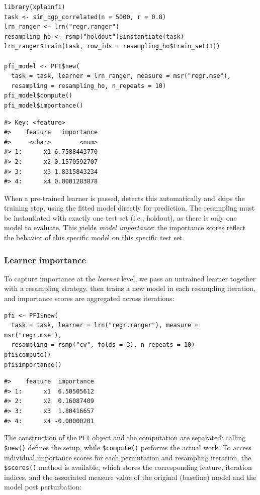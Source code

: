 \begin{verbatim}
library(xplainfi)
task <- sim_dgp_correlated(n = 5000, r = 0.8)
lrn_ranger <- lrn("regr.ranger")
resampling_ho <- rsmp("holdout")$instantiate(task)
lrn_ranger$train(task, row_ids = resampling_ho$train_set(1))

pfi_model <- PFI$new(
  task = task, learner = lrn_ranger, measure = msr("regr.mse"),
  resampling = resampling_ho, n_repeats = 10)
pfi_model$compute()
pfi_model$importance()
\end{verbatim}

\begin{verbatim}
#> Key: <feature>
#>    feature   importance
#>     <char>        <num>
#> 1:      x1 6.7588443770
#> 2:      x2 0.1570592707
#> 3:      x3 1.8315843234
#> 4:      x4 0.0001283878
\end{verbatim}

When a pre-trained learner is passed,  detects this automatically and skips the training step, using the fitted model directly for prediction.
The resampling must be instantiated with exactly one test set (i.e., holdout), as there is only one model to evaluate.
This yields \emph{model importance}: the importance scores reflect the behavior of this specific model on this specific test set.

\subsubsection{Learner importance}\label{learner-importance}

To capture importance at the \emph{learner} level, we pass an untrained learner together with a resampling strategy.
 then trains a new model in each resampling iteration, and importance scores are aggregated across iterations:

\begin{verbatim}
pfi <- PFI$new(
  task = task, learner = lrn("regr.ranger"), measure = msr("regr.mse"),
  resampling = rsmp("cv", folds = 3), n_repeats = 10)
pfi$compute()
pfi$importance()
\end{verbatim}

\begin{verbatim}
#>    feature  importance
#> 1:      x1  6.50505612
#> 2:      x2  0.16087409
#> 3:      x3  1.80416657
#> 4:      x4 -0.00000201
\end{verbatim}

The construction of the \texttt{PFI} object and the computation are separated: calling \texttt{\$new()} defines the setup, while \texttt{\$compute()} performs the actual work.
To access individual importance scores for each permutation and resampling iteration, the \texttt{\$scores()} method is available, which stores the corresponding feature, iteration indices, and the associated measure value of the original (baseline) model and the model post perturbation:

